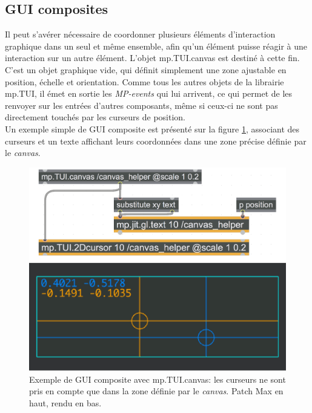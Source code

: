 \subsection{GUI composites}

\noindent Il peut s'avérer nécessaire de coordonner plusieurs éléments d'interaction graphique dans un seul et même ensemble, afin qu'un élément puisse réagir à une interaction sur un autre élément. L'objet mp.TUI.canvas est destiné à cette fin. C'est un objet graphique vide, qui définit simplement une zone ajustable en position, échelle et orientation. Comme tous les autres objets de la librairie mp.TUI, il émet en sortie les \textit{MP-events} qui lui arrivent, ce qui permet de les renvoyer sur les entrées d'autres composants, même si ceux-ci ne sont pas directement touchés par les curseurs de position.\\
\indent Un exemple simple de \gls{GUI} composite est présenté sur la figure \ref{fig:visual_representation:canvas}, associant des curseurs et un texte affichant leurs coordonnées dans une zone précise définie par le \textit{canvas}.


\begin{figure}[!htbp]
	\captionsetup{format=plain}%
	\includegraphics[width=\textwidth]{gfx/06_visual_representation/mpTUI_canvas.pdf}
	\caption[Exemple de GUI composite avec mp.TUI.canvas]{Exemple de GUI composite avec mp.TUI.canvas: les curseurs ne sont pris en compte que dans la zone définie par le \textit{canvas}. Patch Max en haut, rendu en bas.}
	\label{fig:visual_representation:canvas}
\end{figure}

